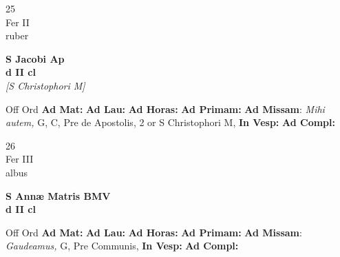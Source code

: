 \documentclass[10pt, openany]{book}
\begin{document}
        \begin{center}
            \begin{minipage}{3.5in}
                \vspace{2em}
                \begin{minipage}{0.5in}
                    {\Huge 25} \\
                    {\normalsize Fer II} \\
                    {\normalsize ruber}
                \end{minipage}
                \begin{minipage}{3.0in}
                    \textbf{ \large S Jacobi Ap \\
                    \textnormal{\normalsize d II cl}} \\ \textit{[S Christophori M]} \\ 
                \end{minipage}
                \begin{justify}Off Ord
                    \textbf{Ad Mat: }
                    \textbf{Ad Lau: }
                    \textbf{Ad Horas: }
                    \textbf{Ad Primam: }\textbf{Ad Missam}: \textit{Mihi autem,} G, C, Pre de Apostolis, 2 or S Christophori M,  
                    \textbf{In Vesp: }
                    \textbf{Ad Compl: }
                \end{justify}
            \end{minipage}
        \end{center}
    
        \begin{center}
            \begin{minipage}{3.5in}
                \vspace{2em}
                \begin{minipage}{0.5in}
                    {\Huge 26} \\
                    {\normalsize Fer III} \\
                    {\normalsize albus}
                \end{minipage}
                \begin{minipage}{3.0in}
                    \textbf{ \large S Annæ Matris BMV \\
                    \textnormal{\normalsize d II cl}} \\ 
                \end{minipage}
                \begin{justify}Off Ord
                    \textbf{Ad Mat: }
                    \textbf{Ad Lau: }
                    \textbf{Ad Horas: }
                    \textbf{Ad Primam: }\textbf{Ad Missam}: \textit{Gaudeamus,} G, Pre Communis,  
                    \textbf{In Vesp: }
                    \textbf{Ad Compl: }
                \end{justify}
            \end{minipage}
        \end{center}
    
\end{document}
